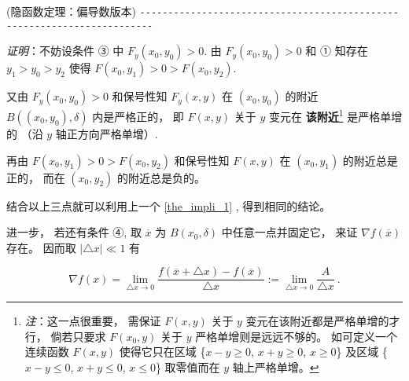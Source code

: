 \begin{theorem}{(隐函数定理：偏导数版本)}
\verb|------------------------------------------------------------------------|

\textsl{证明}：不妨设条件 ③ 中 $F_{y}(x_{0},y_{0})>0.$ 由 $F_{y}(x_{0},y_{0})>0$ 和
① 知存在 $y_{1}>y_{0}>y_{2}$ 使得 $F(x_{0},y_{1})>0>F(x_{0},y_{2})$. 

又由 $F_{y}(x_{0},y_{0})>0$ 和保号性知 $F_{y}(x,y)$ 在 $(x_{0},y_{0})$
的附近 $B((x_{0},y_{0}),\delta)$ 内是严格正的， 即 $F(x,y)$ 关于 $y$ 变元在 \textbf{该附近}\footnote{\textsl{注}：这一点很重要， 需保证 $F(x,y)$ 关于 $y$ 变元在该附近都是严格单增的才行， 倘若只要求 $F(x_{0},y)$
关于 $y$ 严格单增则是远远不够的。 如可定义一个连续函数 $F(x,y)$ 使得它只在区域 \{$x-y\geqslant0$,
$x+y\geqslant0$, $x\geqslant0$\} 及区域 \{$x-y\leqslant0$, $x+y\leqslant0$,
$x\leqslant0$\} 取零值而在 $y$ 轴上严格单增。 } 是严格单增的 （沿 $y$ 轴正方向严格单增）. 

再由 $F(x_{0},y_{1})>0>F(x_{0},y_{2})$ 和保号性知 $F(x,y)$ 在 $(x_{0},y_{1})$
的附近总是正的， 而在 $(x_{0},y_{2})$ 的附近总是负的。 

结合以上三点就可以利用上一个 \autoref{the_impli_1} , 得到相同的结论。 

进一步， 若还有条件 ④, 取 \textbf{$\overline{x}$ }为 $B(x_{0},\delta)$ 中任意一点并固定它， 来证 $\nabla f(\overline{x})$存在。 因而取 $\left|\triangle x\right|\ll1$
有

\begin{equation}\label{eq_impli_1}
\nabla f(x)={\displaystyle {\displaystyle \lim_{\triangle x\rightarrow0}}\frac{f(\overline{x}+\triangle x)-f(\overline{x})}{\triangle x}:={\displaystyle \lim_{\triangle x\rightarrow0}}\frac{A}{\triangle x}}~.
\end{equation}


\end{theorem}
